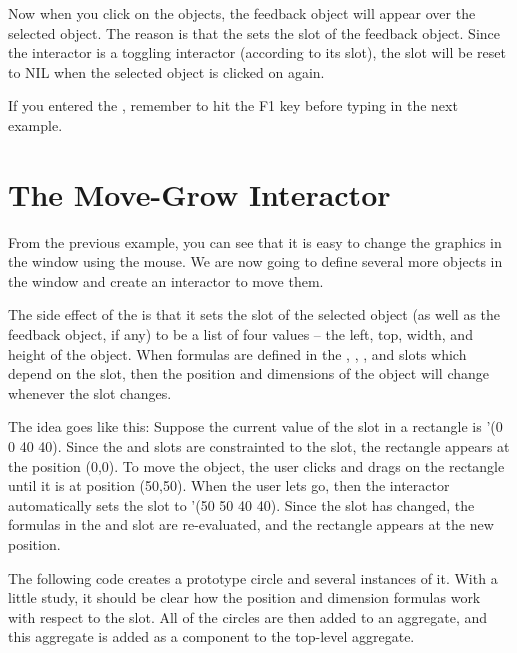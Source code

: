 Now when you click on the objects, the feedback object will appear
over the selected object.  The reason is that the
 sets the  slot of the feedback
object.  Since the interactor is a toggling
interactor (according to its  slot), the 
slot will be reset to NIL when the selected object is clicked on again.

If you entered the , remember to hit the F1 key
before typing in the next example.


\section{The Move-Grow Interactor}

From the previous example, you can see that it is easy to change the
graphics in the window using the mouse.  We are now going to define several
more objects in the window and create an interactor to move them.

The side effect of the  is that it sets the
 slot of the selected object (as well as the feedback object,
if any) to be a list of four values -- the left, top, width, and
height of the object.  When formulas are defined in the ,
, , and  slots which depend on
the  slot, then the position and dimensions of the
object will change whenever the  slot changes.

The idea goes like this:  Suppose the current value of the 
slot in a rectangle is '(0 0 40 40).  Since the  and
 slots are constrainted to the  slot, the rectangle
appears at the position (0,0).  To move the object, the user clicks
and drags on the rectangle until it is at position (50,50).  When the
user lets go, then the interactor automatically sets the 
slot to '(50 50 40 40).  Since the  slot has changed, the
formulas in the  and  slot are re-evaluated, and
the rectangle appears at the new position.

The following code creates a prototype circle and several instances of
it.  With a little study, it should be clear how the position and dimension
formulas work with respect to the  slot.  All of the circles
are then added to an aggregate, and this aggregate is added as a
component to the top-level aggregate.

